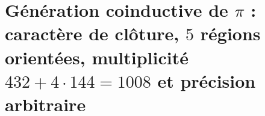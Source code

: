 \chapter{Génération coinductive de \(\pi\) : caractère de clôture, \(5\) régions orientées, multiplicité \(432+4\cdot144=1008\) et précision arbitraire}
\label{chap:p3-final:28:generacion_pi}


